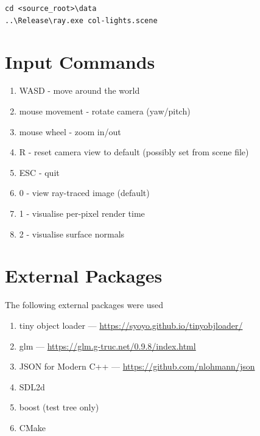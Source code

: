 \verb|cd <source_root>\data| \\
\verb|..\Release\ray.exe col-lights.scene|

\section{Input Commands}
    \begin{enumerate}
    \item WASD - move around the world
    \item mouse movement - rotate camera (yaw/pitch)
    \item mouse wheel - zoom in/out
    \item R - reset camera view to default (possibly set from scene file)
    \item ESC - quit
    \item 0 - view ray-traced image (default)
    \item 1 - visualise per-pixel render time
    \item 2 - visualise surface normals
    \end{enumerate}

\section{External Packages}
The following external packages were used 
\begin{enumerate}
    \item tiny object loader --- \url{https://syoyo.github.io/tinyobjloader/}
    \item glm --- \url{https://glm.g-truc.net/0.9.8/index.html}
    \item JSON for Modern C++ --- \url{https://github.com/nlohmann/json}
    \item SDL2d
    \item boost (test tree only)
    \item CMake
\end{enumerate}

